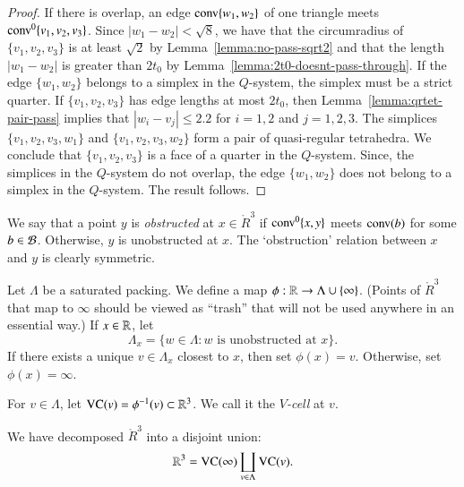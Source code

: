 \begin{proof} If there is overlap, an edge ${\operatorname{conv}}\{w_1,w_2\}$ 
of one triangle meets ${\operatorname{conv}}^0\{v_1,v_2,v_3\}$.  Since
$|w_1-w_2|<\sqrt8$,  we have that the circumradius of
$\{v_1,v_2,v_3\}$ is at least $\sqrt2$ by
Lemma~\ref{lemma:no-pass-sqrt2} and that the length $|w_1-w_2|$ is
greater than $2t_0$ by Lemma~\ref{lemma:2t0-doesnt-pass-through}.
If the edge $\{w_1,w_2\}$ belongs to a simplex in the $Q$-system,
the simplex must be a strict quarter.  If $\{v_1,v_2,v_3\}$ has
edge lengths at most $2t_0$, then
Lemma~\ref{lemma:qrtet-pair-pass} implies that $|w_i-v_j|\le2.2$
for $i=1,2$ and $j=1,2,3$.   The simplices $\{v_1,v_2,v_3,w_1\}$
and $\{v_1,v_2,v_3,w_2\}$ form a pair of quasi-regular tetrahedra.
We conclude that $\{v_1,v_2,v_3\}$ is a face of a quarter in the
$Q$-system. Since, the simplices in the $Q$-system do not overlap,
the edge $\{w_1,w_2\}$ does not belong to a simplex in the
$Q$-system. The result follows.
\end{proof}



\begin{definition} \label{def:obstructed}
We say that a point $y$ is {\it obstructed\/} at $x\in\ring{R}^3$
if ${\operatorname{conv}}^0\{x,y\}$ meets ${\operatorname{conv}}(b)$ for some 
$b\in{\mathcal B}$. Otherwise, $y$ is unobstructed
at $x$.  The `obstruction' relation between $x$ and $y$ is clearly
symmetric.
\end{definition}

\begin{definition}\label{def:trash-phi}
Let $\Lambda$ be a saturated packing. We define a map
$\phi:{\mathbb R}\to\Lambda\cup\{\infty\}$.   (Points of $\ring{R}^3$ that
map to $\infty$ should be viewed as ``trash'' that will not be
used anywhere in an essential way.)  If $x\in {\mathbb R}$, let
   $$\Lambda_x = \{w\in\Lambda : \text{$w$ is unobstructed at $x$}\}.$$
If there exists a unique $v\in\Lambda_x$ closest to $x$, then set
$\phi(x) = v$. Otherwise, set $\phi(x) = \infty$.
\end{definition}

\begin{definition}\label{def:vcell}
For $v\in\Lambda$, let ${\operatorname{VC}}(v)=\phi^{-1}(v)\subset\mathbb{R}^3$.
We call it the {\it $V$-cell\/} at
$v$.
%
\end{definition}

We have decomposed $\ring{R}^3$ into a disjoint union:
    $$
    \mathbb{R}^3 = {\operatorname{VC}}(\infty)\coprod_{v\in\Lambda}{\operatorname{VC}}(v).
    $$

